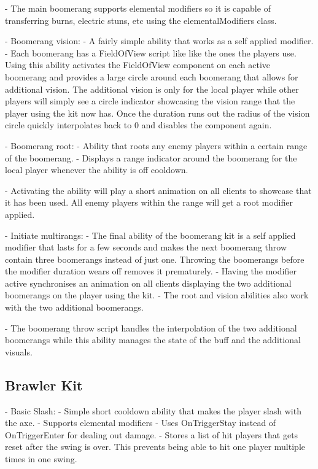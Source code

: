     - The main boomerang supports elemental modifiers so it is capable of transferring burns, electric stuns, etc using the elementalModifiers class. 
    
- Boomerang vision:
    - A fairly simple ability that works as a self applied modifier. 
    - Each boomerang has a FieldOfView script like like the ones the players use. Using this ability activates the FieldOfView component on each active boomerang and provides a large circle around each boomerang that allows for additional vision. The additional vision is only for the local player while other players will simply see a circle indicator showcasing the vision range that the player using the kit now has. Once the duration runs out the radius of the vision circle quickly interpolates back to 0 and disables the component again.

- Boomerang root:
    - Ability that roots any enemy players within a certain range of the boomerang.
    - Displays a range indicator around the boomerang for the local player whenever the ability is off cooldown.
    
    - Activating the ability will play a short animation on all clients to showcase that it has been used. All enemy players within the range will get a root modifier applied. 
    
- Initiate multirangs:
    - The final ability of the boomerang kit is a self applied modifier that lasts for a few seconds and makes the next boomerang throw contain three boomerangs instead of just one. Throwing the boomerangs before the modifier duration wears off removes it prematurely. 
    - Having the modifier active synchronises an animation on all clients displaying the two additional boomerangs on the player using the kit.
    - The root and vision abilities also work with the two additional boomerangs. 
    
    - The boomerang throw script handles the interpolation of the two additional boomerangs while this ability manages the state of the buff and the additional visuals. 
    

\subsection{Brawler Kit}
 - Basic Slash:
    - Simple short cooldown ability that makes the player slash with the axe. 
    - Supports elemental modifiers
    - Uses OnTriggerStay instead of OnTriggerEnter for dealing out damage. 
        - Stores a list of hit players that gets reset after the swing is over. This prevents being able to hit one player multiple times in one swing. 
        
